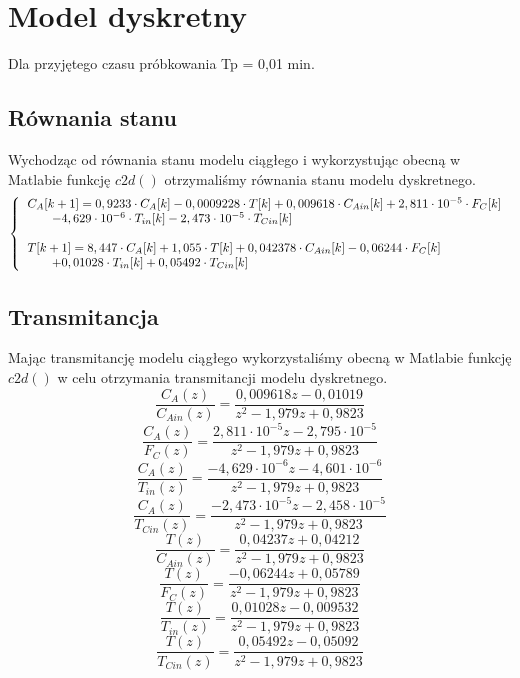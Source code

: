 \chapter{Model dyskretny}
Dla przyjętego czasu próbkowania Tp = 0,01 min.
\section{Równania stanu}
Wychodząc od równania stanu modelu ciągłego i wykorzystując obecną w Matlabie funkcję $c2d()$ otrzymaliśmy równania stanu modelu dyskretnego.
\begin{equation}
	\left\{
	\begin{tabular}{l}
	$C_A[k+1] = 0,9233\cdot C_A[k]  -0,0009228\cdot T[k]+ 0,009618\cdot C_{Ain}[k]+  2,811\cdot 10^{-5}\cdot F_C[k]$\\
	$\quad \quad -4,629\cdot 10^{-6}\cdot T_{in}[k]  -2,473\cdot 10^{-5}\cdot T_{Cin}[k]$\\\\
	$T[k+1] = 8,447\cdot C_A[k] +1,055\cdot T[k]+ 0,042378\cdot C_{Ain}[k]-0,06244\cdot F_C[k]$\\
	$\quad \quad +0,01028\cdot T_{in}[k]  +0,05492\cdot T_{Cin}[k]$\\
	\end{tabular}
	\right.
\end{equation}
\section{Transmitancja}
Mając transmitancję modelu ciągłego wykorzystaliśmy obecną w Matlabie funkcję $c2d()$ w celu otrzymania transmitancji modelu dyskretnego.
\begin{equation}
	\frac{C_A(z)}{C_{Ain}(z)} = \frac{0,009618z-0,01019}{z^2-1,979z+0,9823}
\end{equation}
\begin{equation}
\frac{C_A(z)}{F_C(z)} = \frac{2,811\cdot10^{-5}z-2,795\cdot10^{-5}}{z^2-1,979z+0,9823}
\end{equation}
\begin{equation}
\frac{C_A(z)}{T_{in}(z)} = \frac{-4,629\cdot10^{-6} z - 4,601\cdot10^{-6}}{z^2-1,979z+0,9823}
\end{equation}
\begin{equation}
\frac{C_A(z)}{T_{Cin}(z)} = \frac{-2,473\cdot10^{-5} z - 2,458\cdot 10^{-5}}{z^2-1,979z+0,9823}
\end{equation}
\begin{equation}
\frac{T(z)}{C_{Ain}(z)} = \frac{0,04237 z + 0,04212}{z^2-1,979z+0,9823}
\end{equation}
\begin{equation}
\frac{T(z)}{F_C(z)} = \frac{-0,06244 z + 0,05789}{z^2-1,979z+0,9823}
\end{equation}
\begin{equation}
\frac{T(z)}{T_{in}(z)} = \frac{0,01028 z - 0,009532}{z^2-1,979z+0,9823}
\end{equation}
\begin{equation}
\frac{T(z)}{T_{Cin}(z)} = \frac{0,05492 z - 0,05092}{z^2-1,979z+0,9823}
\end{equation}

